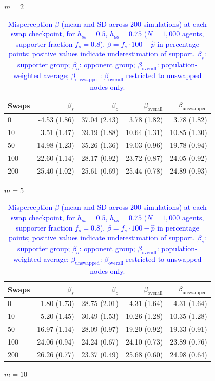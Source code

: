 \begin{table}[H]
\centering
\caption{\textcolor{blue}{Misperception $\beta$ (mean and SD across 200 simulations) at each swap checkpoint, for $h_{ss} = 0.5$, $h_{oo} = 0.75$ ($N = 1{,}000$ agents, supporter fraction $f_s = 0.8$). $\beta = f_s \cdot 100 - \hat{p}$ in percentage points; positive values indicate underestimation of support. $\beta_s$: supporter group; $\beta_o$: opponent group; $\beta_{\mathrm{overall}}$: population-weighted average; $\beta_{\mathrm{unswapped}}$: $\beta_{\mathrm{overall}}$ restricted to unswapped nodes only.}}
\label{tab:subset_fs08_hss500_hoo750}
\par\medskip
\noindent\textit{$m = 2$}\\[2pt]
\begin{tabular}{l rrrr}
\toprule
Swaps & $\beta_s$ & $\beta_o$ & $\beta_{\mathrm{overall}}$ & $\beta_{\mathrm{unswapped}}$ \\
\midrule
0 & -4.53 (1.86) & 37.04 (2.43) & 3.78 (1.82) & 3.78 (1.82) \\
10 & 3.51 (1.47) & 39.19 (1.88) & 10.64 (1.31) & 10.85 (1.30) \\
50 & 14.98 (1.23) & 35.26 (1.36) & 19.03 (0.96) & 19.78 (0.94) \\
100 & 22.60 (1.14) & 28.17 (0.92) & 23.72 (0.87) & 24.05 (0.92) \\
200 & 25.40 (1.02) & 25.61 (0.69) & 25.44 (0.78) & 24.89 (0.93) \\
\bottomrule
\end{tabular}
\par\medskip
\noindent\textit{$m = 5$}\\[2pt]
\begin{tabular}{l rrrr}
\toprule
Swaps & $\beta_s$ & $\beta_o$ & $\beta_{\mathrm{overall}}$ & $\beta_{\mathrm{unswapped}}$ \\
\midrule
0 & -1.80 (1.73) & 28.75 (2.01) & 4.31 (1.64) & 4.31 (1.64) \\
10 & 5.20 (1.45) & 30.49 (1.53) & 10.26 (1.28) & 10.35 (1.28) \\
50 & 16.97 (1.14) & 28.09 (0.97) & 19.20 (0.92) & 19.33 (0.91) \\
100 & 24.06 (0.94) & 24.24 (0.67) & 24.10 (0.73) & 23.89 (0.76) \\
200 & 26.26 (0.77) & 23.37 (0.49) & 25.68 (0.60) & 24.98 (0.64) \\
\bottomrule
\end{tabular}
\par\medskip
\noindent\textit{$m = 10$}\\[2pt]

\end{table}
